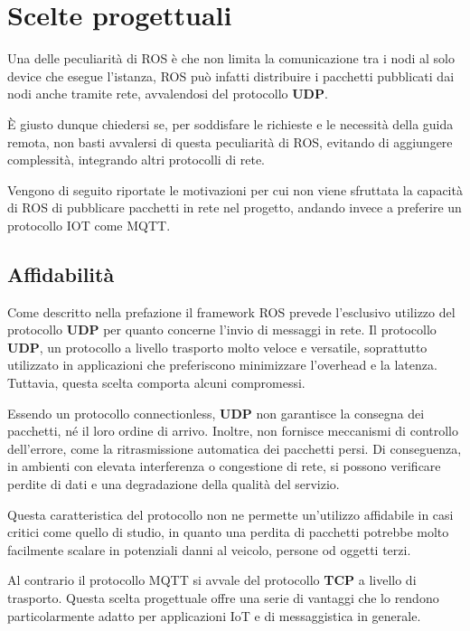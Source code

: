 \section{Scelte progettuali}
Una delle peculiarità di ROS è che non limita la comunicazione tra i nodi al solo device che esegue l'istanza, ROS può infatti distribuire i pacchetti pubblicati dai nodi anche tramite rete, avvalendosi del protocollo \textbf{UDP}. 

\noindent È giusto dunque chiedersi se, per soddisfare le richieste e le necessità della guida remota, non basti avvalersi di questa peculiarità di ROS, evitando di aggiungere complessità, integrando altri protocolli di rete. 

\noindent Vengono di seguito riportate le motivazioni per cui non viene sfruttata la capacità di ROS di pubblicare pacchetti in rete nel progetto, andando invece a preferire un protocollo IOT come MQTT.

\subsection{Affidabilità}
Come descritto nella prefazione il framework ROS prevede l'esclusivo utilizzo del protocollo \textbf{UDP} per quanto concerne l'invio di messaggi in rete. Il protocollo \textbf{UDP}, un protocollo a livello trasporto molto veloce e versatile, soprattutto utilizzato in applicazioni che preferiscono minimizzare l'overhead e la latenza. Tuttavia, questa scelta comporta alcuni compromessi. 

\noindent Essendo un protocollo connectionless, \textbf{UDP} non garantisce la consegna dei pacchetti, né il loro ordine di arrivo. Inoltre, non fornisce meccanismi di controllo dell'errore, come la ritrasmissione automatica dei pacchetti persi. Di conseguenza, in ambienti con elevata interferenza o congestione di rete, si possono verificare perdite di dati e una degradazione della qualità del servizio.

\noindent Questa caratteristica del protocollo non ne permette un'utilizzo affidabile in casi critici come quello di studio, in quanto una perdita di pacchetti potrebbe molto facilmente scalare in potenziali danni al veicolo, persone od oggetti terzi.

\noindent Al contrario il protocollo MQTT si avvale del protocollo \textbf{TCP} a livello di trasporto. Questa scelta progettuale offre una serie di vantaggi che lo rendono particolarmente adatto per applicazioni IoT e di messaggistica in generale.

